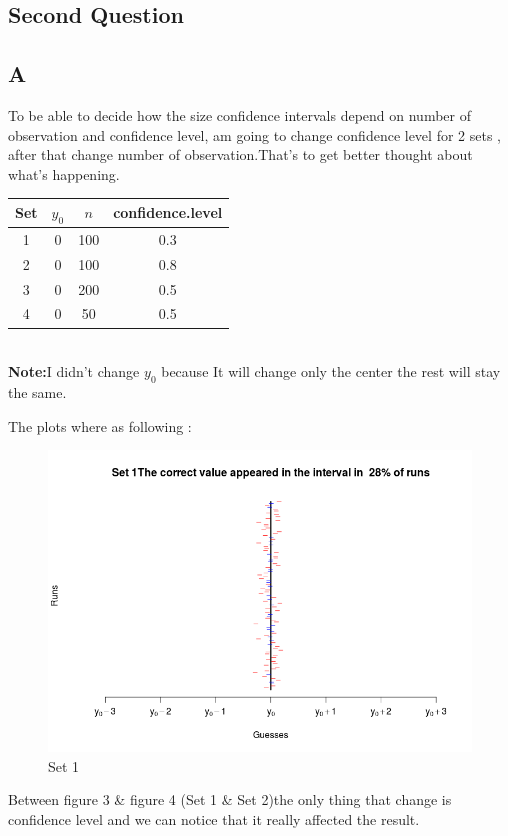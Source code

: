 \documentclass{article}
\begin{document}
\begin{multicols*}{2}
\begin{flushleft}
{\centering \section*{Second Question}}
{\centering\subsection*{A}}
To be able to decide how the size confidence intervals depend on number of observation and confidence level, am going to change confidence level for 2 sets , after that change number of observation.That's to get better thought about what's happening.\\
\begin{tabular}{|c|c|c|c|}
	\hline
	Set&\(y_0\)&\(n\)&confidence.level\\
	\hline
	1&0&100&0.3\\
	\hline
	2&0&100&0.8\\
	\hline
	3&0&200&0.5\\
	\hline
	4&0&50&0.5\\
	\hline
\end{tabular}\\
\textbf{Note:}I didn't change \(y_0\) because It will change only the center the rest will stay the same.
\begin{flushleft}
The plots where as following :
\begin{figure}[H]
\begin{center}
	\includegraphics[scale=0.3]{plotset1.png}
\end{center}
\caption{Set 1 }
\end{figure}
Between figure 3 \& figure 4 (Set 1 \& Set 2)the only thing that change is confidence level and we can notice that it really affected the result.

\end{flushleft}
\end{flushleft}
\end{multicols*}
\end{document}
